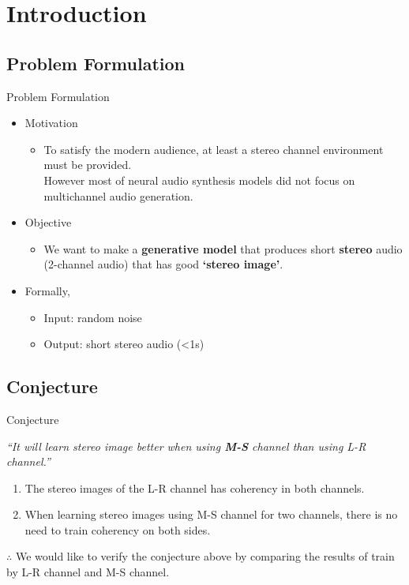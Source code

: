\section{Introduction}
\subsection{Problem Formulation}
\begin{frame}{Problem Formulation}
    \begin{itemize}
        \item Motivation
        \begin{itemize}
            \item To satisfy the modern audience, at least a stereo channel environment must be provided.\\
            However most of neural audio synthesis models did not focus on multichannel audio generation.
        \end{itemize}
        \bigskip
        \item Objective
        \begin{itemize}
            \item We want to make a \textbf{generative model} that produces short \textbf{stereo} audio (2-channel audio) that has good \textbf{`stereo image'}.
        \end{itemize}
        \bigskip
        \item Formally,
        \begin{itemize}
            \item Input: random noise
            \item Output: short stereo audio (<1s)
        \end{itemize}
    \end{itemize}
\end{frame}

\subsection{Conjecture}
\begin{frame}{Conjecture}
    \begin{center}
        \textit{``It will learn stereo image better when using \textbf{M-S} channel than using L-R channel.''}
    \end{center}
    \bigskip
    \bigskip
    \smallskip
    \begin{enumerate}
        \item The stereo images of the L-R channel has coherency in both channels.
        \item When learning stereo images using M-S channel for two channels, there is no need to train coherency on both sides.
    \end{enumerate}
    \bigskip
    $\therefore$ We would like to verify the conjecture above by comparing the results of train by L-R channel and M-S channel.
\end{frame}

